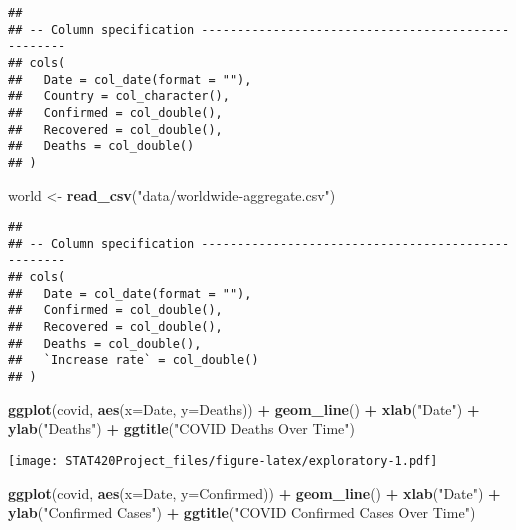 \documentclass[]{article}
\newenvironment{Shaded}{\begin{snugshade}}{\end{snugshade}}
\newcommand{\DataTypeTok}[1]{\textcolor[rgb]{0.13,0.29,0.53}{#1}}
\newcommand{\KeywordTok}[1]{\textcolor[rgb]{0.13,0.29,0.53}{\textbf{#1}}}
\newcommand{\NormalTok}[1]{#1}
\newcommand{\OperatorTok}[1]{\textcolor[rgb]{0.81,0.36,0.00}{\textbf{#1}}}
\newcommand{\StringTok}[1]{\textcolor[rgb]{0.31,0.60,0.02}{#1}}
\begin{document}
\begin{verbatim}
## 
## -- Column specification ---------------------------------------------------
## cols(
##   Date = col_date(format = ""),
##   Country = col_character(),
##   Confirmed = col_double(),
##   Recovered = col_double(),
##   Deaths = col_double()
## )
\end{verbatim}

\begin{Shaded}
\begin{Highlighting}[]
\NormalTok{world <-}\StringTok{ }\KeywordTok{read_csv}\NormalTok{(}\StringTok{"data/worldwide-aggregate.csv"}\NormalTok{)}
\end{Highlighting}
\end{Shaded}

\begin{verbatim}
## 
## -- Column specification ---------------------------------------------------
## cols(
##   Date = col_date(format = ""),
##   Confirmed = col_double(),
##   Recovered = col_double(),
##   Deaths = col_double(),
##   `Increase rate` = col_double()
## )
\end{verbatim}

\begin{Shaded}
\begin{Highlighting}[]
\KeywordTok{ggplot}\NormalTok{(covid, }\KeywordTok{aes}\NormalTok{(}\DataTypeTok{x=}\NormalTok{Date, }\DataTypeTok{y=}\NormalTok{Deaths)) }\OperatorTok{+}
\StringTok{  }\KeywordTok{geom_line}\NormalTok{() }\OperatorTok{+}\StringTok{ }\KeywordTok{xlab}\NormalTok{(}\StringTok{"Date"}\NormalTok{) }\OperatorTok{+}\StringTok{ }\KeywordTok{ylab}\NormalTok{(}\StringTok{"Deaths"}\NormalTok{) }\OperatorTok{+}\StringTok{ }
\StringTok{  }\KeywordTok{ggtitle}\NormalTok{(}\StringTok{"COVID Deaths Over Time"}\NormalTok{)}
\end{Highlighting}
\end{Shaded}

\texttt{[image: STAT420Project\_files/figure-latex/exploratory-1.pdf]}

\begin{Shaded}
\begin{Highlighting}[]
\KeywordTok{ggplot}\NormalTok{(covid, }\KeywordTok{aes}\NormalTok{(}\DataTypeTok{x=}\NormalTok{Date, }\DataTypeTok{y=}\NormalTok{Confirmed)) }\OperatorTok{+}
\StringTok{  }\KeywordTok{geom_line}\NormalTok{() }\OperatorTok{+}\StringTok{ }\KeywordTok{xlab}\NormalTok{(}\StringTok{"Date"}\NormalTok{) }\OperatorTok{+}\StringTok{ }\KeywordTok{ylab}\NormalTok{(}\StringTok{"Confirmed Cases"}\NormalTok{) }\OperatorTok{+}\StringTok{ }
\StringTok{  }\KeywordTok{ggtitle}\NormalTok{(}\StringTok{"COVID Confirmed Cases Over Time"}\NormalTok{)}
\end{Highlighting}
\end{Shaded}
\end{document}

